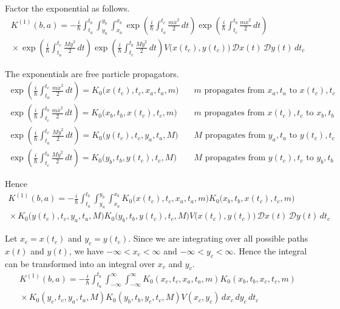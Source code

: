 Factor the exponential as follows.
\begin{multline*}
K^{(1)}(b,a)=-\frac{i}{\hbar}\int_{t_a}^{t_b}\int_{y_a}^{y_b}\int_{x_a}^{x_b}
\exp\left(\frac{i}{\hbar}\int_{t_a}^{t_c}\frac{m\dot x^2}{2}\,dt\right)
\exp\left(\frac{i}{\hbar}\int_{t_c}^{t_b}\frac{m\dot x^2}{2}\,dt\right)
\\
{}\times
\exp\left(\frac{i}{\hbar}\int_{t_a}^{t_c}\frac{M\dot y^2}{2}\,dt\right)
\exp\left(\frac{i}{\hbar}\int_{t_c}^{t_b}\frac{M\dot y^2}{2}\,dt\right)
V\bigl(x(t_c),y(t_c)\bigr)
\,\mathscr Dx(t)\,\mathscr Dy(t)\,dt_c
\end{multline*}

The exponentials are free particle propagators.
\begin{align*}
\exp\left(\frac{i}{\hbar}\int_{t_a}^{t_c}\frac{m\dot x^2}{2}\,dt\right)
=K_0\bigl(x(t_c),t_c,x_a,t_a,m\bigr)
&\quad\text{$m$ propagates from $x_a,t_a$ to $x(t_c),t_c$}
\\
\exp\left(\frac{i}{\hbar}\int_{t_c}^{t_b}\frac{m\dot x^2}{2}\,dt\right)
=K_0\bigl(x_b,t_b,x(t_c),t_c,m\bigr)
&\quad\text{$m$ propagates from $x(t_c),t_c$ to $x_b,t_b$}
\\
\exp\left(\frac{i}{\hbar}\int_{t_a}^{t_c}\frac{M\dot y^2}{2}\,dt\right)
=K_0\bigl(y(t_c),t_c,y_a,t_a,M\bigr)
&\quad\text{$M$ propagates from $y_a,t_a$ to $y(t_c),t_c$}
\\
\exp\left(\frac{i}{\hbar}\int_{t_c}^{t_b}\frac{M\dot y^2}{2}\,dt\right)
=K_0\bigl(y_b,t_b,y(t_c),t_c,M\bigr)
&\quad\text{$M$ propagates from $y(t_c),t_c$ to $y_b,t_b$}
\end{align*}

Hence
\begin{multline*}
K^{(1)}(b,a)=-\frac{i}{\hbar}\int_{t_a}^{t_b}\int_{y_a}^{y_b}\int_{x_a}^{x_b}
K_0\bigl(x(t_c),t_c,x_a,t_a,m\bigr)
K_0\bigl(x_b,t_b,x(t_c),t_c,m\bigr)
\\
{}\times
K_0\bigl(y(t_c),t_c,y_a,t_a,M\bigr)
K_0\bigl(y_b,t_b,y(t_c),t_c,M\bigr)
V\bigl(x(t_c),y(t_c)\bigr)
\,\mathscr Dx(t)\,\mathscr Dy(t)\,dt_c
\end{multline*}

Let $x_c=x(t_c)$ and $y_c=y(t_c)$.
Since we are integrating over all possible paths $x(t)$ and $y(t)$,
we have $-\infty<x_c<\infty$ and $-\infty<y_c<\infty$.
Hence the integral can be transformed into an integral over $x_c$ and $y_c$.
\begin{multline*}
K^{(1)}(b,a)=-\frac{i}{\hbar}\int_{t_a}^{t_b}\int_{-\infty}^\infty\int_{-\infty}^\infty
K_0(x_c,t_c,x_a,t_a,m)
K_0(x_b,t_b,x_c,t_c,m)
\\
{}\times
K_0(y_c,t_c,y_a,t_a,M)
K_0(y_b,t_b,y_c,t_c,M)
V(x_c,y_c)
\,dx_c\,dy_c\,dt_c
\end{multline*}

